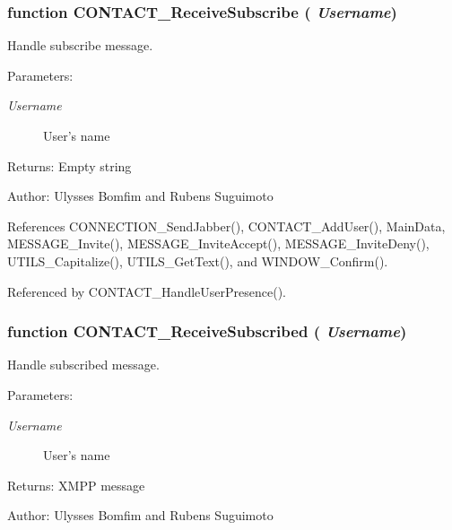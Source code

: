 \subsubsection[CONTACT\_\-ReceiveSubscribe]{\setlength{\rightskip}{0pt plus 5cm}function CONTACT\_\-ReceiveSubscribe ( {\em Username})}\label{invite_8js_4faf39656bf14608ddb5a9be8c9f4918}


Handle subscribe message. 

\begin{Desc}
\item[Parameters:]
\begin{description}
\item[{\em Username}]User's name \end{description}
\end{Desc}
\begin{Desc}
\item[Returns:]Empty string \end{Desc}
\begin{Desc}
\item[Author:]Ulysses Bomfim and Rubens Suguimoto \end{Desc}


References CONNECTION\_\-SendJabber(), CONTACT\_\-AddUser(), MainData, MESSAGE\_\-Invite(), MESSAGE\_\-InviteAccept(), MESSAGE\_\-InviteDeny(), UTILS\_\-Capitalize(), UTILS\_\-GetText(), and WINDOW\_\-Confirm().

Referenced by CONTACT\_\-HandleUserPresence().
\subsubsection[CONTACT\_\-ReceiveSubscribed]{\setlength{\rightskip}{0pt plus 5cm}function CONTACT\_\-ReceiveSubscribed ( {\em Username})}\label{invite_8js_ecd90dc0768cd5cb226d362239963a56}


Handle subscribed message. 

\begin{Desc}
\item[Parameters:]
\begin{description}
\item[{\em Username}]User's name \end{description}
\end{Desc}
\begin{Desc}
\item[Returns:]XMPP message \end{Desc}
\begin{Desc}
\item[Author:]Ulysses Bomfim and Rubens Suguimoto \end{Desc}


